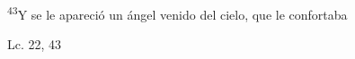 \documentclass[../../rosario.tex]{subfiles}
\begin{document}
    \textsuperscript{43}Y se le apareció un ángel venido del cielo, que le confortaba
    \begin{flushright}
    Lc. 22, 43
    \end{flushright}
\end{document}
